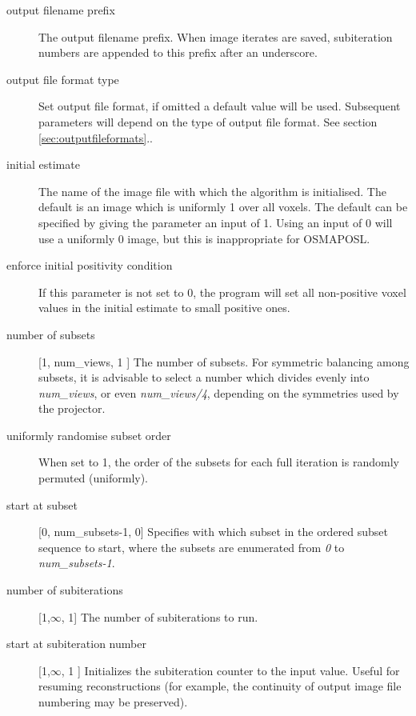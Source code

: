 \documentclass{article}
\begin{document}
{ 
}
\label{sec:IterativeReconSettings}
\begin{description}

\item[output filename prefix]
 The output filename prefix. When image iterates are saved, subiteration 
numbers are appended to this prefix after an underscore.

\item[output file format type]
Set output file format, if omitted a default value will be used. 
Subsequent parameters will depend on the type of output file 
format. See section \ref{sec:outputfileformats}..


\item[initial estimate]
The name of the image file with which the algorithm is initialised. 
The default is an image which is uniformly 1 over all voxels. 
The default can be specified by giving the parameter an input 
of 1. Using an input of 0 will use a uniformly 0 image, but this 
is inappropriate for OSMAPOSL.


\item[enforce initial positivity condition]
If this parameter is not set to 0, the program will set all non-positive 
voxel values in the initial estimate to small positive ones.


\item[number of subsets] [1, num\_views, 1 {]}
The number of subsets. For symmetric balancing among subsets, 
it is advisable to select a number which divides evenly into \textit{num\_views},
or even \textit{num\_views/4}, depending on the symmetries used by the projector.


\item[uniformly randomise subset order]
When set to 1, the order of the subsets for each full iteration 
is randomly permuted (uniformly).


\item[start at subset] [0, num\_subsets-1, 0{]}
Specifies with which subset in the ordered subset sequence to 
start, where the subsets are enumerated from \textit{0} to \textit{num\_subsets-1}. 

\item[number of subiterations] [1,\ensuremath{\infty}, 1{]}
The number of subiterations to run.


\item[start at subiteration number] [1,\ensuremath{\infty}, 1 {]}
Initializes the subiteration counter to the input value. Useful 
for resuming reconstructions (for example, the continuity of 
output image file numbering may be preserved).



\end{description}
\end{document}
